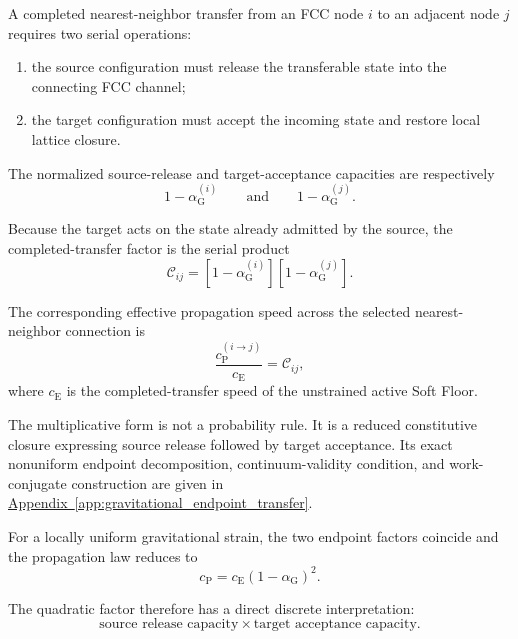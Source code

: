 A completed nearest-neighbor transfer from an FCC node $i$ to an adjacent node $j$ requires two serial operations:

\begin{enumerate}
    \item the source configuration must release the transferable state into the connecting FCC channel;
    \item the target configuration must accept the incoming state and restore local lattice closure.
\end{enumerate}

The normalized source-release and target-acceptance capacities are respectively
\begin{equation}
    1-\alpha_{\mathrm{G}}^{(i)} \qquad\text{and}\qquad 1-\alpha_{\mathrm{G}}^{(j)}.
\end{equation}

Because the target acts on the state already admitted by the source, the completed-transfer factor is the serial product
\begin{equation}
    \mathcal{C}_{ij} = \left[ 1-\alpha_{\mathrm{G}}^{(i)} \right] \left[ 1-\alpha_{\mathrm{G}}^{(j)} \right].
    \label{eq:gravitational_endpoint_factor}
\end{equation}

The corresponding effective propagation speed across the selected nearest-neighbor connection is
\begin{equation}
    \frac{ c_{\mathrm{P}}^{(i\rightarrow j)} }{ c_{\mathrm{E}} } = \mathcal{C}_{ij},
\end{equation}
where $c_{\mathrm{E}}$ is the completed-transfer speed of the unstrained active Soft Floor.

The multiplicative form is not a probability rule. It is a reduced constitutive closure expressing source release followed by target acceptance. Its exact nonuniform endpoint decomposition, continuum-validity condition, and work-conjugate construction are given in \hyperref[app:gravitational_endpoint_transfer]{Appendix~\ref*{app:gravitational_endpoint_transfer}}.

For a locally uniform gravitational strain, the two endpoint factors coincide and the propagation law reduces to
\begin{equation}
    c_{\mathrm{P}} = c_{\mathrm{E}} \left( 1-\alpha_{\mathrm{G}} \right)^2.
    \label{eq:gravitational_endpoint_speed}
\end{equation}

The quadratic factor therefore has a direct discrete interpretation:
\begin{equation}
    \text{source release capacity} \times \text{target acceptance capacity}.
\end{equation}

